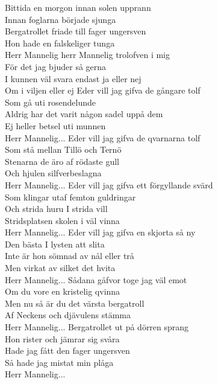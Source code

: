 
Bittida en morgon innan solen upprann\\
Innan foglarna började sjunga\\
Bergatrollet friade till fager ungersven\\
Hon hade en falskeliger tunga\\
\hops
{} Herr Mannelig herr Mannelig trolofven i mig\\
 För det jag bjuder så gerna\\
 I kunnen väl svara endast ja eller nej\\
 Om i viljen eller ej
\hops
Eder vill jag gifva de gångare tolf\\
Som gå uti rosendelunde\\
Aldrig har det varit någon sadel uppå dem\\
Ej heller betsel uti munnen\\
\hops
{} Herr Mannelig...
\hops
Eder vill jag gifva de qvarnarna tolf\\
Som stå mellan Tillö och Ternö\\
Stenarna de äro af rödaste gull\\
Och hjulen silfverbeslagna\\
\hops
{} Herr Mannelig...
\hops
Eder vill jag gifva ett förgyllande svärd\\
Som klingar utaf femton guldringar\\
Och strida huru I strida vill\\
Stridsplatsen skolen i väl vinna\\
\hops
{} Herr Mannelig...
\hops
Eder vill jag gifva en skjorta så ny\\
Den bästa I lysten att slita\\
Inte är hon sömnad av nål eller trå\\
Men virkat av silket det hvita\\
\hops
{} Herr Mannelig...
\hops
Sådana gåfvor toge jag väl emot\\
Om du vore en kristelig qvinna\\
Men nu så är du det värsta bergatroll\\
Af Neckens och djävulens stämma\\
\hops
{} Herr Mannelig...
\hops
Bergatrollet ut på dörren sprang\\
Hon rister och jämrar sig svåra\\
Hade jag fått den fager ungersven\\
Så hade jag mistat min plåga\\
\hops
{} Herr Mannelig...